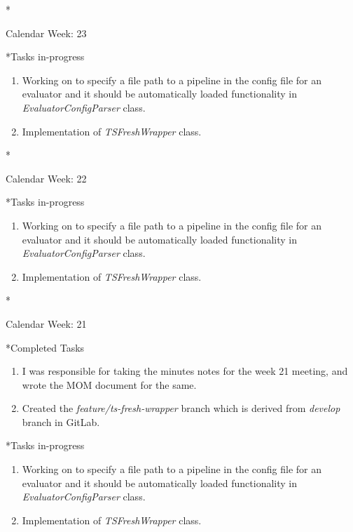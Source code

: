 \documentclass[11pt,a4paper]{article}
\begin{document}
\newpage
\begin{section}*{Calendar Week: 23 \hfill \date{11 June, 2021}}
 \begin{subsection}*{Tasks in-progress}
     \begin{enumerate}
         \item Working on to specify a file path to a pipeline in the config file for an evaluator and it should be
               automatically loaded functionality in \textit{EvaluatorConfigParser} class.
         \item Implementation of \textit{TSFreshWrapper} class.
     \end{enumerate}
 \end{subsection}
\end{section}

\newpage
\begin{section}*{Calendar Week: 22 \hfill \date{04 June, 2021}}
 \begin{subsection}*{Tasks in-progress}
     \begin{enumerate}
         \item Working on to specify a file path to a pipeline in the config file for an evaluator and it should be
               automatically loaded functionality in \textit{EvaluatorConfigParser} class.
         \item Implementation of \textit{TSFreshWrapper} class.
     \end{enumerate}
 \end{subsection}
\end{section}

\newpage
\begin{section}*{Calendar Week: 21 \hfill \date{28 May, 2021}}
 \begin{subsection}*{Completed Tasks}
     \begin{enumerate}
         \item I was responsible for taking the minutes notes for the week 21 meeting, and wrote the MOM document for the same.
         \item Created the \textit{feature/ts-fresh-wrapper} branch which is derived from \textit{develop} branch in GitLab.
     \end{enumerate}
 \end{subsection}
 \begin{subsection}*{Tasks in-progress}
     \begin{enumerate}
         \item Working on to specify a file path to a pipeline in the config file for an evaluator and it should be automatically loaded functionality in \textit{EvaluatorConfigParser} class.
         \item Implementation of \textit{TSFreshWrapper} class.
     \end{enumerate}
 \end{subsection}
\end{section}
\end{document}
